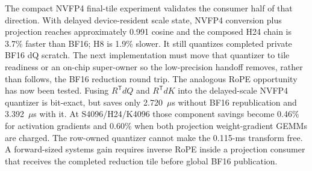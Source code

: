 The compact NVFP4 final-tile experiment validates the consumer half of that
direction.  With delayed device-resident scale state, NVFP4 conversion plus
projection reaches approximately 0.991 cosine and the composed H24 chain is
3.7\% faster than BF16; H8 is 1.9\% slower.  It still quantizes completed
private BF16 dQ scratch.  The next implementation must move that quantizer to
tile readiness or an on-chip super-owner so the low-precision handoff removes,
rather than follows, the BF16 reduction round trip.  The analogous RoPE
opportunity has now been tested.  Fusing $R^{\mathsf T}dQ$ and
$R^{\mathsf T}dK$ into the delayed-scale NVFP4 quantizer is bit-exact, but
saves only 2.720~$\mu$s without BF16 republication and 3.392~$\mu$s with it.
At S4096/H24/K4096 those component savings become 0.46\% for activation
gradients and 0.60\% when both projection weight-gradient GEMMs are charged.
The row-owned quantizer cannot make the 0.115-ms transform free.  A
forward-sized systems gain requires inverse RoPE inside a projection consumer
that receives the completed reduction tile before global BF16 publication.
